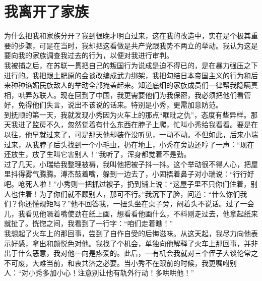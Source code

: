 \fancyhead[RO]{} %
\fancyhead[LE]{} %
\chapter*{我离开了家族}
\thispagestyle{empty}
为什么把我和家族分开？我到很晚才明白过来，这在我的改造中，实在是个极其重要的步骤，可是在当时，我却把这看做是共产党跟我势不两立的举动。我认为这是要向我的家族调查我过去的行为，以便对我进行审判。\\

我被捕之后，在苏联一贯把自己的叛国行为说成是迫不得已的，是在暴力强压之下进行的。我把跟土肥原的会谈改编成武力绑架，我把勾结日本帝国主义的行为和后来种种谄媚民族敌人的举动全部掩盖起来。知道底细的家族成员们一律帮我隐瞒真相，哄弄苏联人。现在回到了中国，我更需要他们为我保密，我必须把他们看管好，免得他们失言，说出不该说的话来。特别是小秀，更需加意防范。\\

到抚顺的第一天，我就发现小秀因为火车上的那点“眶毗之仇”，态度有些异样。那天我进了监房不久，忽然觉着有什么东西在脖子上爬，忙叫小秀给我看看。要是在以往，他早就过来了，可是那天他却装作没听见，一动不动。不但如此，后来小瑞过来，从我脖子后头找到一个小毛虫，扔在地上，小秀在旁边还哼了一声：“现在还放生，放了生叫它害别人！”我听了，浑身都觉着不是劲。\\

过了几天，小瑞给我整理被褥，我叫他把被子抖一抖。这个举动很不得人心，把屋里抖得雾气腾腾。溥杰鼓着嘴，躲到一边去了，小固捂着鼻子对小瑞说：“行行好吧。呛死人啦！”小秀则一把抓过被子，扔到铺上说：“这屋子里不只你们住着，别人也住着！为了你们就不顾别人，那可不行。”我沉下了脸，问道：“什么你们我们？你还懂规矩吗？”他不回答我，一扭头坐在桌子旁，闷着头不说话。过了一会儿，我看见他噘着嘴使劲在纸上画，想看看他画什么，不料刚走过去，他拿起纸来就扯了。恍惚之间，我看到了一行字：“咱们走着瞧！”\\

我想起了火车上的那回事，尝到了自作自受的后悔滋味。从这天起，我尽力向他表示好感，拿出和颜悦色对他。我找了个机会，单独向他解释了火车上那回事，并非出于什么恶意，我对他一向是疼爱的。此后，一有机会我就对三个侄子大谈伦常之不可废，大难当前，和衷共济之必要。当小秀不在跟前的时候，我更嘱咐别人：“对小秀多加小心！注意别让他有轨外行动！多哄哄他！”\\

